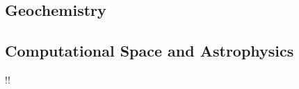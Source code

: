 \documentclass[11pt,a4paper,twoside,twocolumn]{article}
\makeatletter
\renewcommand*{\cleardoublepage}{\clearpage\if@twoside \ifodd\c@page\else
    \hbox{}
    \if!\blankpagetext!\else
    \vfil \begin{center} \setlength{\fboxsep}{3mm}%
    \framebox{\blankpagetext}
    \end{center}\vfil\vfil \fi
    \newpage\if@twocolumn\hbox{}\newpage\fi\fi\fi}
\makeatother
\begin{document}
%
%
%
%
%
%
%
%

%
%
%
%
%
%

%
\subsection{Geochemistry}
%
\begin{bibunit}[plain]

\putbib[combined]
\end{bibunit}
%
%
\subsection{Computational Space and Astrophysics}
\begin{bibunit}[plain]

\putbib[combined]
\end{bibunit}
%
\begin{bibunit}[plain]

\putbib[combined]
\end{bibunit}
%
%
%
%
%

%
%
%
%

\cleardoublepage
%
%
%
\end{document}
